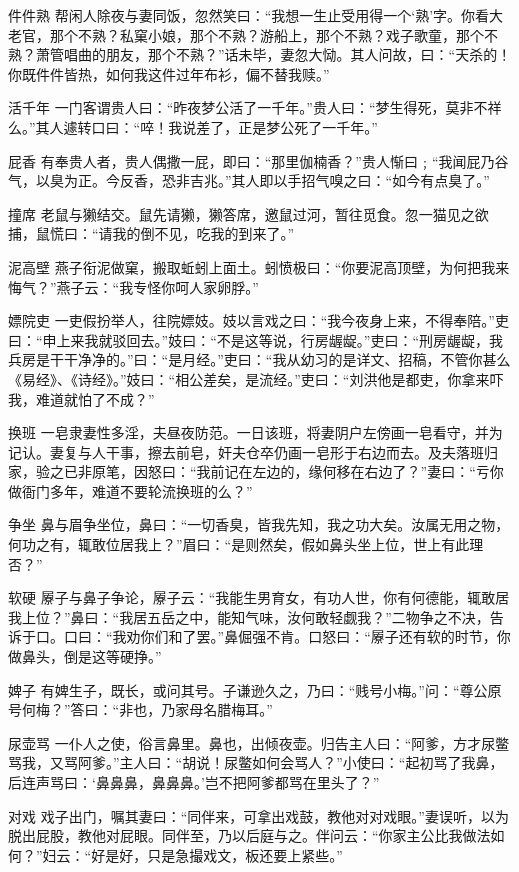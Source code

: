 \documentclass[12pt,UTF8]{ctexbook}
\begin{document}
件件熟
帮闲人除夜与妻同饭，忽然笑曰：“我想一生止受用得一个‘熟’字。你看大老官，那个不熟？私窠小娘，那个不熟？游船上，那个不熟？戏子歌童，那个不熟？萧管唱曲的朋友，那个不熟？”话未毕，妻忽大恸。其人问故，曰：“天杀的！你既件件皆热，如何我这件过年布衫，偏不替我赎。”

活千年
一门客谓贵人曰：“昨夜梦公活了一千年。”贵人曰：“梦生得死，莫非不祥么。”其人遽转口曰：“啐！我说差了，正是梦公死了一千年。”

屁香
有奉贵人者，贵人偶撒一屁，即曰：“那里伽楠香？”贵人惭曰﹔“我闻屁乃谷气，以臭为正。今反香，恐非吉兆。”其人即以手招气嗅之曰：“如今有点臭了。”

撞席
老鼠与獭结交。鼠先请獭，獭答席，邀鼠过河，暂往觅食。忽一猫见之欲捕，鼠慌曰：“请我的倒不见，吃我的到来了。”

泥高壁
燕子衔泥做窠，搬取蚯蚓上面土。蚓愤极曰：“你要泥高顶壁，为何把我来悔气？”燕子云：“我专怪你呵人家卵脬。”

嫖院吏
一吏假扮举人，往院嫖妓。妓以言戏之曰：“我今夜身上来，不得奉陪。”吏曰：“申上来我就驳回去。”妓曰：“不是这等说，行房龌龊。”吏曰：“刑房龌龊，我兵房是干干净净的。”曰：“是月经。”吏曰：“我从幼习的是详文、招稿，不管你甚么《易经》、《诗经》。”妓曰：“相公差矣，是流经。”吏曰：“刘洪他是都吏，你拿来吓我，难道就怕了不成？”

换班
一皂隶妻性多淫，夫昼夜防范。一日该班，将妻阴户左傍画一皂看守，并为记认。妻复与人干事，擦去前皂，奸夫仓卒仍画一皂形于右边而去。及夫落班归家，验之已非原笔，因怒曰：“我前记在左边的，缘何移在右边了？”妻曰：“亏你做衙门多年，难道不要轮流换班的么？”

争坐
鼻与眉争坐位，鼻曰：“一切香臭，皆我先知，我之功大矣。汝属无用之物，何功之有，辄敢位居我上？”眉曰：“是则然矣，假如鼻头坐上位，世上有此理否？”

软硬
屪子与鼻子争论，屪子云：“我能生男育女，有功人世，你有何德能，辄敢居我上位？”鼻曰：“我居五岳之中，能知气味，汝何敢轻觑我？”二物争之不决，告诉于口。口曰：“我劝你们和了罢。”鼻倔强不肯。口怒曰：“屪子还有软的时节，你做鼻头，倒是这等硬挣。”

婢子
有婢生子，既长，或问其号。子谦逊久之，乃曰：“贱号小梅。”问：“尊公原号何梅？”答曰：“非也，乃家母名腊梅耳。”

尿壶骂
一仆人之使，俗言鼻里。鼻也，出倾夜壶。归告主人曰：“阿爹，方才尿鳖骂我，又骂阿爹。”主人曰：“胡说！尿鳖如何会骂人？”小使曰：“起初骂了我鼻，后连声骂曰：‘鼻鼻鼻，鼻鼻鼻。’岂不把阿爹都骂在里头了？”

对戏
戏子出门，嘱其妻曰：“同伴来，可拿出戏鼓，教他对对戏眼。”妻误听，以为脱出屁股，教他对屁眼。同伴至，乃以后庭与之。伴问云：“你家主公比我做法如何？”妇云：“好是好，只是急撮戏文，板还要上紧些。”
\end{document}
